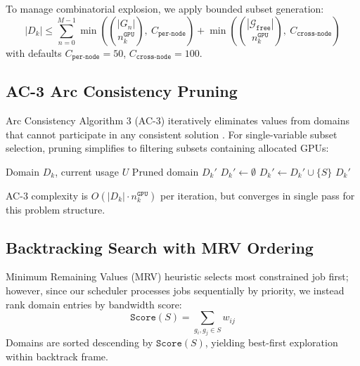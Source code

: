 \documentclass[11pt, twoside]{article}
\begin{document}
To manage combinatorial explosion, we apply bounded subset generation:
\begin{equation}
|D_k| \leq \sum_{n=0}^{M-1} \min\left(\binom{|G_n|}{n_k^{\texttt{GPU}}},\ C_{\texttt{per-node}}\right) + \min\left(\binom{|\mathcal{G}_{\texttt{free}}|}{n_k^{\texttt{GPU}}},\ C_{\texttt{cross-node}}\right)
\label{eq:domain_bound}
\end{equation}
with defaults $C_{\texttt{per-node}}=50$, $C_{\texttt{cross-node}}=100$.

\subsection{AC-3 Arc Consistency Pruning}

Arc Consistency Algorithm 3 (AC-3) iteratively eliminates values from domains that cannot participate in any consistent solution \cite{maciel2020}. For single-variable subset selection, pruning simplifies to filtering subsets containing allocated GPUs:

\begin{algorithm}[h]
\caption{AC-3 Pruning for GPU Subset Domain}
\label{alg:ac3_prune}
\begin{algorithmic}[1]
\Require Domain $D_k$, current usage $U$
\Ensure Pruned domain $D_k'$
\State $D_k' \gets \emptyset$
        \State $D_k' \gets D_k' \cup \{S\}$
    \EndIf
\EndFor
\Return $D_k'$
\end{algorithmic}
\end{algorithm}

AC-3 complexity is $O(|D_k| \cdot n_k^{\texttt{GPU}})$ per iteration, but converges in single pass for this problem structure.

\subsection{Backtracking Search with MRV Ordering}

Minimum Remaining Values (MRV) heuristic selects most constrained job first; however, since our scheduler processes jobs sequentially by priority, we instead rank domain entries by bandwidth score:
\begin{equation}
\texttt{Score}(S) = \sum_{g_i,g_j \in S} w_{ij}
\label{eq:bandwidth_score}
\end{equation}
Domains are sorted descending by $\texttt{Score}(S)$, yielding best-first exploration within backtrack frame.
\end{document}
